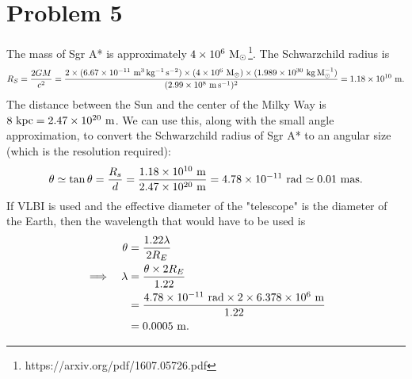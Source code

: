\documentclass[11pt,letterpaper]{article}
\begin{document}
\section*{Problem 5}

The mass of Sgr A* is approximately $4\times 10^{6}~{\rm M_\odot}$\footnote{https://arxiv.org/pdf/1607.05726.pdf}. The Schwarzchild radius is
\begin{align*}
    R_S = \frac{2GM}{c^2} = \frac{2\times (6.67\times 10^{-11}~{\rm m^3\,kg^{-1}\,s^{-2}})\times (4\times 10^{6}~{\rm M_\odot})\times (1.989\times 10^{30}~{\rm kg\,M_\odot^{-1}})}{(2.99\times 10^{8}~{\rm m\,s^{-1}})^2} = 1.18\times 10^{10}~{\rm m}.
\end{align*}
The distance between the Sun and the center of the Milky Way is $8~{\rm kpc} = 2.47\times 10^{20}~{\rm m}$. We can use this, along with the small angle approximation, to convert the Schwarzchild radius of Sgr A* to an angular size (which is the resolution required):
\begin{align*}
    \theta \simeq \tan{\theta} = \frac{R_s}{d} = \frac{1.18\times 10^{10}~{\rm m}}{2.47\times 10^{20}~{\rm m}} = 4.78\times 10^{-11}~{\rm rad} \simeq 0.01~{\rm mas}. 
\end{align*}
If VLBI is used and the effective diameter of the "telescope" is the diameter of the Earth, then the wavelength that would have to be used is 
\begin{alignat*}{2}
    &&\theta &= \frac{1.22\lambda}{2R_E} \\
    \implies&&\lambda &= \frac{\theta \times 2R_E}{1.22} \\
    &&&= \frac{4.78\times 10^{-11}~{\rm rad}\times 2\times 6.378\times 10^{6}~{\rm m}}{1.22} \\
    &&&= 0.0005~{\rm m}.
\end{alignat*}
\end{document}
